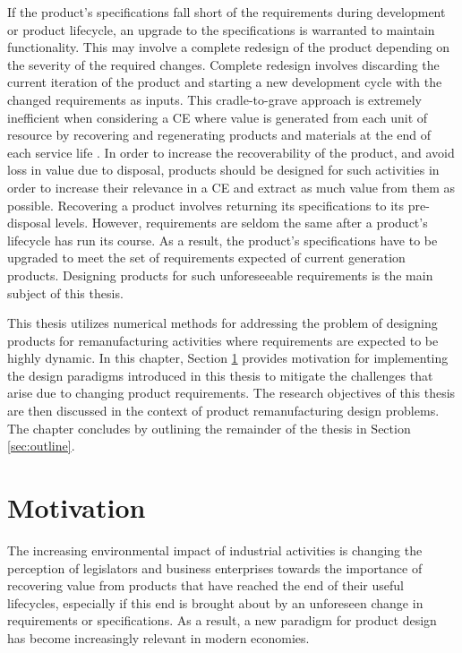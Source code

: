 If the product's specifications fall short of the requirements during development or product lifecycle, an upgrade to the specifications is warranted to maintain functionality. This may involve a complete redesign of the product depending on the severity of the required changes. Complete redesign involves discarding the current iteration of the product and starting a new development cycle with the changed requirements as inputs. This cradle-to-grave approach is extremely inefficient when considering a \ac{CE} where value is generated from each unit of resource by recovering and regenerating products and materials at the end of each service life \cite{MacArthur2013b}. In order to increase the recoverability of the product, and avoid loss in value due to disposal, products should be designed for such activities in order to increase their relevance in a \ac{CE} and extract as much value from them as possible. Recovering a product involves returning its specifications to its pre-disposal levels. However, requirements are seldom the same after a product's lifecycle has run its course. As a result, the product's specifications have to be upgraded to meet the set of requirements expected of current generation products. Designing products for such unforeseeable requirements is the main subject of this thesis.

This thesis utilizes numerical methods for addressing the problem of designing prod\-ucts for remanufacturing activities where requirements are expected to be highly dynamic. In this chapter, Section \ref{sec:motivation} provides motivation for implementing the design para\-digms introduced in this thesis to mitigate the challenges that arise due to changing product requirements. The research objectives of this thesis are then discussed in the context of product remanufacturing design problems. The chapter concludes by outlining the remainder of the thesis in Section \ref{sec:outline}.

\section{Motivation}
\label{sec:motivation}

The increasing environmental impact of industrial activities is changing the perception of legislators and business enterprises towards the importance of recovering value from products that have reached the end of their useful lifecycles, especially if this end is brought about by an unforeseen change in requirements or specifications. As a result, a new paradigm for product design has become increasingly relevant in modern economies.

